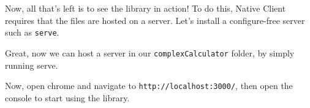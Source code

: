 \begin{Shaded}
\begin{Highlighting}[]
\DataTypeTok{>}
\KeywordTok{>}
    \KeywordTok{>}
    \NormalTok{\});}
\end{Highlighting}
\end{Shaded}

Now, all that's left is to see the library in action! To do this, Native
Client requires that the files are hosted on a server. Let's install a
configure-free server such as \texttt{serve}.

\begin{Shaded}
\begin{Highlighting}[]
 
\end{Highlighting}
\end{Shaded}

Great, now we can host a server in our \texttt{complexCalculator}
folder, by simply running serve.

\begin{Shaded}
\begin{Highlighting}[]
\end{Highlighting}
\end{Shaded}

\begin{Shaded}
\begin{Highlighting}[]
 
\end{Highlighting}
\end{Shaded}

Now, open chrome and navigate to \texttt{http://localhost:3000/}, then
open the console to start using the library.


